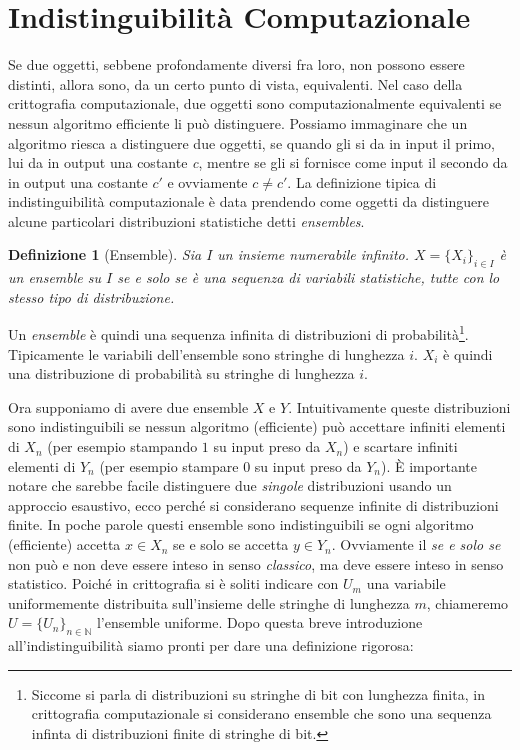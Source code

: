 \documentclass[a4paper,openright,twoside,12pt]{report}
\newtheorem{definizione}{Definizione}[chapter]
\begin{document}
\section{Indistinguibilit\`a Computazionale}
Se due oggetti, sebbene profondamente diversi fra loro, non possono essere distinti, allora sono, da un certo punto di vista, equivalenti.
Nel caso della crittografia computazionale, due oggetti sono computazionalmente equivalenti se nessun algoritmo efficiente li pu\`o distinguere.
Possiamo immaginare che un algoritmo riesca a distinguere due oggetti, se quando gli si da in input il primo, lui da in output una costante \emph{c}, mentre se gli si 
fornisce come input il secondo da in output una costante \emph{$c'$} e ovviamente $c \neq c'$.
La definizione tipica di indistinguibilit\`a computazionale \`e data prendendo come oggetti da distinguere alcune particolari distribuzioni statistiche detti \emph{ensembles}.

\begin{definizione}[Ensemble]
Sia $I$ un insieme numerabile infinito. $X=\{X_i\}_{i \in I}$ \`e un ensemble su $I$ se e solo se \`e una sequenza di variabili statistiche, tutte con lo stesso tipo di distribuzione.
\end{definizione}
Un \emph{ensemble} \`e quindi una sequenza infinita di distribuzioni di probabilit\`a\footnote{Siccome si parla di distribuzioni su stringhe di bit con lunghezza finita,
in crittografia computazionale si considerano ensemble che sono una sequenza infinta di distribuzioni finite di stringhe di bit.}. 
Tipicamente le variabili dell'ensemble sono stringhe di lunghezza $i$. $X_i$ \`e quindi una distribuzione di probabilit\`a su stringhe di lunghezza $i$.

Ora supponiamo di avere due ensemble $X$ e $Y$. Intuitivamente queste distribuzioni sono indistinguibili se nessun algoritmo (efficiente) pu\`o accettare infiniti elementi di $X_n$
(per esempio stampando $1$ su input preso da $X_n$) e scartare infiniti elementi di $Y_n$ (per esempio stampare $0$ su input preso da $Y_n$). \`E importante notare che sarebbe facile 
distinguere due \emph{singole} distribuzioni usando un approccio esaustivo, ecco perch\'e si considerano sequenze infinite di distribuzioni finite.
In poche parole questi ensemble sono indistinguibili se ogni algoritmo (efficiente) accetta $x \in X_n$ se e solo se accetta $y \in Y_n$. Ovviamente il \emph{se e solo se} non pu\`o e non deve
essere inteso in senso \emph{classico}, ma deve essere inteso in senso statistico. Poich\'e in crittografia si \`e soliti indicare con $U_m$ una variabile
uniformemente distribuita sull'insieme delle stringhe di lunghezza $m$, chiameremo $U=\{U_n\}_{n \in \mathbb{N}}$ l'ensemble uniforme.
Dopo questa breve introduzione all'indistinguibilit\`a siamo pronti per dare una definizione rigorosa:
\end{document}

